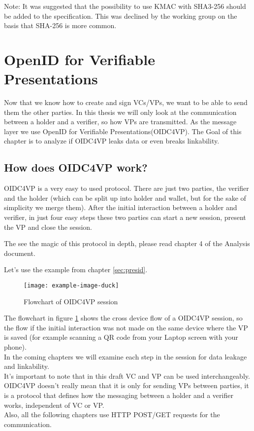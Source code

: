 \documentclass[
	a4paper               %
	,bibliography=totoc   %
	,listof=totoc         %
	,monolingual
]{bfhthesis}              %
\begin{document}
Note: It was suggested that the possibility to use KMAC with SHA3-256 should be added to the specification. This was declined by the working group on the basis that SHA-256 is more common.

\section{OpenID for Verifiable Presentations}
Now that we know how to create and sign VCs/VPs, we want to be able to send them the other parties.
In this thesis we will only look at the communication between a holder and a verifier, so how VPs are transmitted.
As the message layer we use OpenID for Verifiable Presentations(OIDC4VP)\cite{oidc4vp}.
The Goal of this chapter is to analyze if OIDC4VP leaks data or even breaks linkability.

\subsection{How does OIDC4VP work?}
OIDC4VP is a very easy to used protocol.
There are just two parties, the verifier and the holder (which can be split up into holder and wallet, but for the sake of simplicity we merge them).
After the initial interaction between a holder and verifier, in just four easy steps these two parties can start a new session, present the VP and close the session.

The see the magic of this protocol in depth, please read chapter 4 of the Analysis document.

Let's use the example from chapter \ref{sec:presid}.

\begin{figure}[h]
	\centering
	\texttt{[image: example-image-duck]}
	\label{fig:flowvp}
	\caption{Flowchart of OIDC4VP session}
\end{figure}

The flowchart in figure \ref{fig:flowvp} shows the cross device flow of a OIDC4VP session, so the flow if the initial interaction was not made on the same device where the VP is saved (for example scanning a QR code from your Laptop screen with your phone).\\
In the coming chapters we will examine each step in the session for data leakage and linkability.\\
It's important to note that in this draft VC and VP can be used interchangeably.
OIDC4VP doesn't really mean that it is only for sending VPs between parties, it is a protocol that defines how the messaging between a holder and a verifier works, independent of VC or VP.\\
Also, all the following chapters use HTTP POST/GET requests for the communication.
\end{document}
